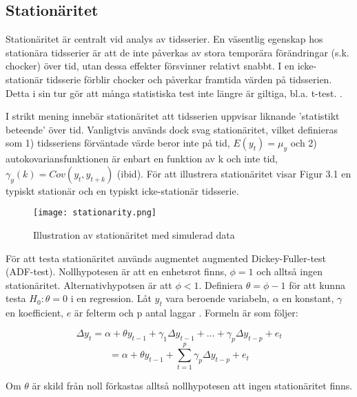 \documentclass[11pt]{article}
\numberwithin{equation}{section}
\numberwithin{table}{section}
\numberwithin{figure}{section}
\begin{document}
\subsection{Stationäritet}
Stationäritet är centralt vid analys av tidsserier. En väsentlig egenskap hos stationära tidsserier är att de inte påverkas av stora temporära förändringar (s.k. chocker) över tid, utan dessa effekter försvinner relativt snabbt. I en icke-stationär tidsserie förblir chocker och påverkar framtida värden på tidsserien. Detta i sin tur gör att många statistiska test inte längre är giltiga, bl.a. t-test. \parencite[][,s.329 f.]{montgomery2015forecasting}. \par

I strikt mening innebär stationäritet att tidsserien uppvisar liknande 'statistikt beteende' över tid. Vanligtvis används dock svag stationäritet, vilket definieras som 1) tidsseriens förväntade värde beror inte på tid, \(E(y_t)=\mu_y\) och 2) autokovariansfunktionen är enbart en funktion av k och inte tid, \(\gamma_y(k) = Cov(y_t, y_{t+k})\) (ibid). För att illustrera stationäritet visar Figur 3.1 en typiskt stationär och en typiskt icke-stationär tidsserie.

\begin{figure}[H]
\caption{Illustration av stationäritet med simulerad data}
\texttt{[image: stationarity.png]}
\centering
\end{figure}

För att testa stationäritet används augmentet augmented Dickey-Fuller-test (ADF-test). Nollhypotesen är att en enhetsrot finns, \(\phi=1\) och alltså ingen stationäritet. Alternativhypotsen är att \(\phi<1\). Definiera \(\theta = \phi -1 \) för att kunna testa \(H_0:\theta=0\) i en regression. Låt \(y_t\) vara beroende variabeln, \( \alpha \) en konstant, \( \gamma \) en koefficient, \(e\) är felterm och p antal laggar \parencite[][,s.610 ff.]{wooldridge2018introductory}. Formeln är som följer:

\begin{equation}
    \Delta y_t = \alpha + \theta y_{t-1} + \gamma_1\Delta y_{t-1} + ... + \gamma_p\Delta y_{t-p} + e_t
\end{equation}
\begin{equation}
        = \alpha + \theta y_{t-1} + \sum_{t=1}^{p}\gamma_p \Delta y_{t-p} + e_t
\end{equation}

Om \(\theta\) är skild från noll förkastas alltså nollhypotesen att ingen stationäritet finns.
\end{document}
